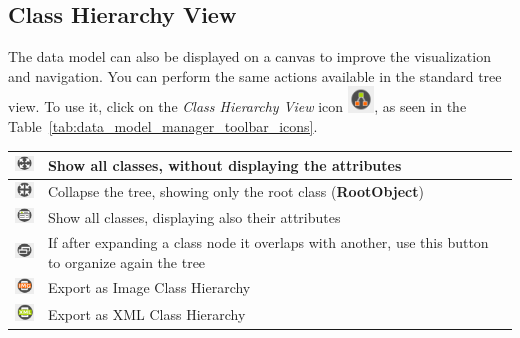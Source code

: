 \documentclass[a4paper]{article}
\begin{document}
		\subsection{Class Hierarchy View}
			The data model can also be displayed on a canvas to improve the visualization and navigation. You can perform the same actions available in the standard tree view. To use it, click on the \textit{Class Hierarchy View} icon \includegraphics[width=0.7cm]{img/icon_data_model_class_hierarchy_view.png}, as seen in the Table~\ref{tab:data_model_manager_toolbar_icons}.
			\begin{table}[h!]
				\centering
				\begin{tabular}{cp{10cm}}
					\includegraphics[width=0.7cm]{img/icon_expand_all.png} & Show all classes, without displaying the attributes\\
					\midrule
					\includegraphics[width=0.7cm]{img/icon_collapse_all.png} & Collapse the tree, showing only the root class (\textbf{RootObject})\\
					\midrule
					\includegraphics[width=0.7cm]{img/icon_expand_all_with_attributes.png} & Show all classes, displaying also their attributes\\
					\midrule
					\includegraphics[width=0.7cm]{img/icon_organize.png} & If after expanding a class node it overlaps with another, use this button to organize again the tree\\
					\midrule
					\includegraphics[width=0.7cm]{img/icon_export_as_image.png} & Export as Image Class Hierarchy\\
					\midrule
					\includegraphics[width=0.7cm]{img/icon_export_as_xml.png} & Export as XML Class Hierarchy\\

\end{tabular}
\end{table}
\end{document}
